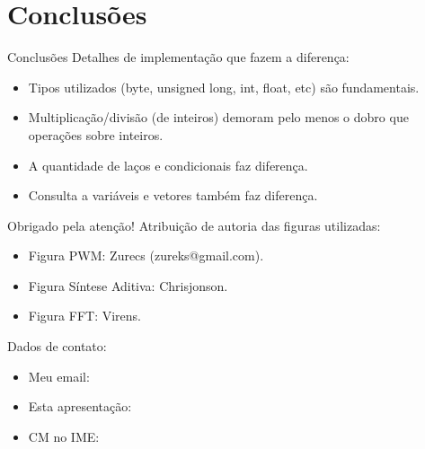 \section{Conclusões}

\begin{frame}{Conclusões}
Detalhes de implementação que fazem a diferença:
\begin{itemize}
  \item Tipos utilizados (byte, unsigned long, int, float, etc) são fundamentais.
  \item Multiplicação/divisão (de inteiros) demoram pelo menos o dobro que operações sobre
        inteiros.
  \item A quantidade de laços e condicionais faz diferença.
  \item Consulta a variáveis e vetores também faz diferença.
\end{itemize}
\end{frame}

\begin{frame}{Obrigado pela atenção!}
%
%
Atribuição de autoria das figuras utilizadas:
\begin{itemize}
  \item Figura PWM: Zurecs (zureks@gmail.com).
  \item Figura Síntese Aditiva: Chrisjonson.
  \item Figura FFT: Virens.
\end{itemize}
\vspace{2em}
Dados de contato:
\begin{itemize}
\item Meu email: 
\item Esta apresentação: 
\item CM no IME: 
\end{itemize}
\end{frame}
